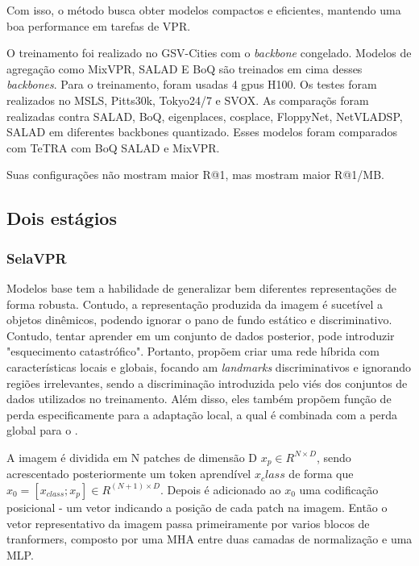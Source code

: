\documentclass[letterpaper, 10 pt, conference]{ieeeconf}  %
\begin{document}
Com isso, o método busca obter modelos compactos e eficientes, mantendo uma boa performance em tarefas de VPR.


O treinamento foi realizado no GSV-Cities com o \textit{backbone} congelado. Modelos de agregação como MixVPR, SALAD E BoQ são treinados em cima desses \textit{backbones}. Para o treinamento, foram usadas 4 gpus H100. Os testes foram realizados no MSLS, Pitts30k, Tokyo24/7 e SVOX. As comparaçõs foram realizadas contra SALAD, BoQ, eigenplaces, cosplace, FloppyNet, NetVLADSP, SALAD em diferentes backbones quantizado.  Esses modelos foram comparados com TeTRA com BoQ SALAD e MixVPR.

Suas configurações não mostram maior R@1, mas mostram maior R@1/MB.


\subsection{Dois estágios}

\subsubsection{SelaVPR}

Modelos base tem a habilidade de generalizar bem diferentes representações de forma robusta. Contudo, a representação produzida da imagem é sucetível a objetos dinêmicos, podendo ignorar o pano de fundo estático e discriminativo. Contudo, tentar aprender em um conjunto de dados posterior, pode introduzir "esquecimento catastrófico". Portanto, \cite{selavpr} propõem criar uma rede híbrida com características locais e globais, focando am \textit{landmarks} discriminativos e ignorando regiões irrelevantes, sendo a discriminação introduzida pelo viés dos conjuntos de dados utilizados no treinamento. Além disso, eles também propõem função de perda especificamente para a adaptação local, a qual é combinada com a perda global para o .

A imagem é dividida em N patches de dimensão D $x_p \in R^{N \times D}$, sendo acrescentado posteriormente um token aprendível $x_class$ de forma que $x_0 = [x_{class}; x_p] \in R^{(N+1) \times D}$. Depois é adicionado ao $x_0$ uma codificação posicional - um vetor indicando a posição de cada patch na imagem. Então o vetor representativo da imagem passa primeiramente por varios blocos de tranformers, composto por uma MHA entre duas camadas de normalização e uma MLP. 
\end{document}
